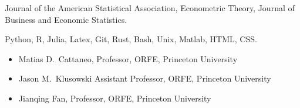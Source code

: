 \documentclass[
  date,
  number,
]{wgu-cv}
\begin{document}
Journal of the American Statistical Association,
Econometric Theory,
Journal of Business and Economic Statistics.


Python,
R,
Julia,
Latex,
Git,
Rust,
Bash,
Unix,
Matlab,
HTML,
CSS.


\vspace*{-2mm}

\begin{itemize}

  \item
    Matias D.\ Cattaneo,
    Professor,
    ORFE,
    Princeton University

  \item
    Jason M.\ Klusowski
    Assistant Professor,
    ORFE,
    Princeton University

  \item
    Jianqing Fan,
    Professor,
    ORFE,
    Princeton University

\end{itemize}

\end{document}

